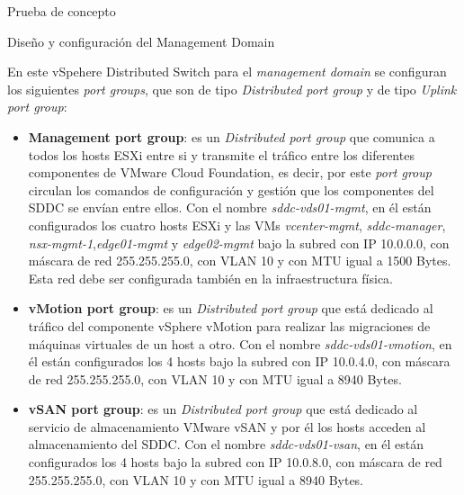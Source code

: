 \begin{section}{Prueba de concepto}
\begin{subsection}{Diseño y configuración del Management Domain}
\begin{itemize}
    \end{itemize}
    En este vSpehere Distributed Switch para el \textit{management domain} se configuran los siguientes \textit{port groups}, que son de tipo \textit{Distributed port group} y de tipo \textit{Uplink port group}:
    \begin{itemize}
           
            \item \textbf{Management port group}: es un \textit{Distributed port group} que comunica a todos los hosts ESXi entre si y transmite el tráfico entre los diferentes componentes de VMware Cloud Foundation, es decir, por este \textit{port group} circulan los comandos de configuración y gestión que los componentes del SDDC se envían entre ellos. Con el nombre \textit{sddc-vds01-mgmt}, en él están configurados los cuatro hosts ESXi y las VMs \textit{vcenter-mgmt}, \textit{sddc-manager}, \textit{nsx-mgmt-1},\textit{edge01-mgmt} y \textit{edge02-mgmt} bajo la subred con IP 10.0.0.0, con máscara de red 255.255.255.0, con VLAN 10 y con MTU igual a 1500 Bytes. Esta red debe ser configurada también en la infraestructura física.
            
            \item \textbf{vMotion port group}: es un \textit{Distributed port group} que está dedicado al tráfico del componente vSphere vMotion para realizar las migraciones de máquinas virtuales de un host a otro. Con el nombre \textit{sddc-vds01-vmotion}, en él están configurados los 4 hosts bajo la subred con IP 10.0.4.0, con máscara de red 255.255.255.0, con VLAN 10 y con MTU igual a 8940 Bytes.
            
            \item \textbf{vSAN port group}: es un \textit{Distributed port group} que está dedicado al servicio de almacenamiento VMware vSAN y por él los hosts acceden al almacenamiento del SDDC. Con el nombre \textit{sddc-vds01-vsan}, en él están configurados los 4 hosts bajo la subred con IP 10.0.8.0, con máscara de red 255.255.255.0, con VLAN 10 y con MTU igual a 8940 Bytes.
            

\end{itemize}
\end{subsection}
\end{section}
